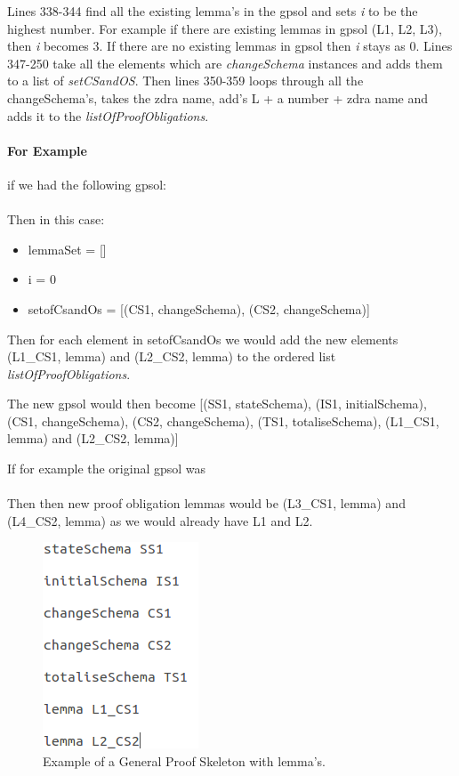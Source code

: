 Lines 338-344 find all the existing lemma's in the \gls{gpsol} and sets \emph{i} to be the highest number. For example if there are existing lemmas in \gls{gpsol} (L1, L2, L3), then \emph{i} becomes 3. If there are no existing lemmas in \gls{gpsol} then \emph{i} stays as 0. Lines 347-250 take all the elements which are \emph{changeSchema} instances and adds them to a list of \emph{setCSandOS}. Then lines 350-359 loops through all the changeSchema's, takes the \gls{zdra} name, add's L + a number + \gls{zdra} name and adds it to the \emph{listOfProofObligations}.

\paragraph{For Example}

if we had the following \gls{gpsol}: \\
 \\
Then in this case:
\begin{itemize}
\item lemmaSet = []
\item i = 0
\item setofCsandOs = [(CS1, changeSchema), (CS2, changeSchema)]
\end{itemize}

Then for each element in setofCsandOs we would add the new elements (L1\_CS1, lemma) and (L2\_CS2, lemma) to the ordered list \emph{listOfProofObligations}.

The new \gls{gpsol} would then become [(SS1, stateSchema), (IS1, initialSchema), (CS1, changeSchema), (CS2, changeSchema), (TS1, totaliseSchema), (L1\_CS1, lemma) and (L2\_CS2, lemma)]

If for example the original \gls{gpsol} was \\
\\
Then then new proof obligation lemmas would be (L3\_CS1, lemma) and (L4\_CS2, lemma) as we would already have L1 and L2.

\begin{figure}[H]
\centering
\includegraphics[scale=0.5]{Figures/skeleton/proofskeletonwithpo.png}
\caption{Example of a General Proof Skeleton with lemma's.}
\label{fig:gpswithpo}
\end{figure}

